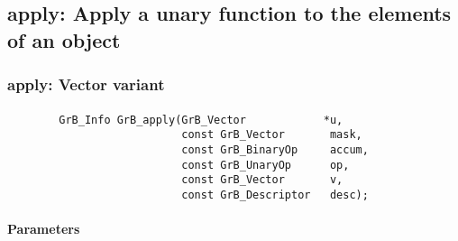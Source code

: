 \subsection{{\sf apply}: Apply a unary function to the elements of an object}


\subsubsection{{\sf apply}: Vector variant}
\paragraph{\syntax}

\begin{verbatim}
        GrB_Info GrB_apply(GrB_Vector            *u,
                           const GrB_Vector       mask,
                           const GrB_BinaryOp     accum,
                           const GrB_UnaryOp      op,
                           const GrB_Vector       v,
                           const GrB_Descriptor   desc);
\end{verbatim}

\paragraph{Parameters}

